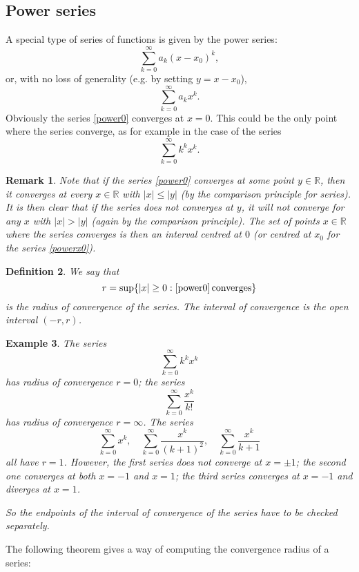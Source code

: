 \documentclass[a4paper,reqno]{amsart}
\numberwithin{equation}{section}
\newtheorem{definition}{Definition}[section]
\newtheorem{remark}[definition]{Remark}
\newtheorem{example}[definition]{Example}
\def\R{\mathbb{R}}
\begin{document}
\subsection{Power series}
A special type of series of functions is given by the power series:
\begin{equation}\label{powerx0}
\sum_{k=0}^\infty a_k(x-x_0)^k,
\end{equation}
or, with no loss of generality (e.g. by setting $y=x-x_0$),
\begin{equation}\label{power0}
\sum_{k=0}^\infty a_k x^k.
\end{equation}
Obviously the series \eqref{power0} converges at $x=0$. This could be the only point where the series converge, as for example in the case of the series
$$
\sum_{k=0}^\infty k^k x^k.
$$

\begin{remark}
Note that if the series \eqref{power0} converges at some point $y\in \R$, then it converges at every $x\in \R$ with $|x|\leq |y|$ (by the comparison principle for series). It is then clear that if the series does not converges at $y$, 
it will not converge for any $x$ with $|x|>|y|$ (again by the comparison principle). The set of points $x\in \R$ where the series converges is then an 
interval centred at $0$ (or centred at $x_0$ for the series \eqref{powerx0}).
\end{remark}

\begin{definition}
We say that 
$$
r = \sup \{|x|\geq 0: \eqref{power0} \, \textrm{converges}\}
$$
is the radius of convergence of the series. The interval of convergence is the open interval $(-r,r)$.
\end{definition}

\begin{example}
The series 
$$
\sum_{k=0}^\infty k^k x^k
$$
has radius of convergence $r=0$; the series 
$$
\sum_{k=0}^\infty \frac{x^k}{k!}
$$
has radius of convergence $r=\infty$.
The series 
$$
\sum_{k=0}^\infty  x^k, \quad \sum_{k=0}^\infty  \frac{x^k}{(k+1)^2}, \quad \sum_{k=0}^\infty  \frac{x^k}{k+1}
$$
all have $r=1$. However, the first series does not converge at $x=\pm1$; the second one converges at both $x=-1$ and $x=1$; the third series converges at $x=-1$ and diverges at $x=1$. 

So the endpoints of the interval of convergence of the series have to be checked separately.
\end{example}

The following theorem gives a way of computing the convergence radius of a series:
\end{document}
